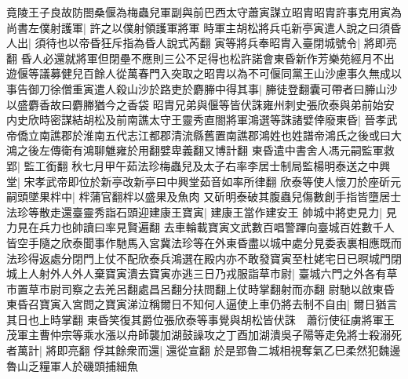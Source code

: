 竟陵王子良故防閤桑偃為梅蟲兒軍副與前巴西太守蕭寅謀立昭胄昭胄許事克用寅為尚書左僕射護軍|{
	許之以僕射領護軍將軍}
時軍主胡松將兵屯新亭寅遣人說之曰須昏人出|{
	須待也以帝昏狂斥指為昏人說式芮翻}
寅等將兵奉昭胄入臺閉城號令|{
	將即亮翻}
昏人必還就將軍但閉壘不應則三公不足得也松許諾會東昏新作芳樂苑經月不出遊偃等議募健兒百餘人從萬春門入突取之昭胄以為不可偃同黨王山沙慮事久無成以事告御刀徐僧重寅遣人殺山沙於路吏於麝幐中得其事|{
	幐徒登翻囊可帶者曰幐山沙以盛麝香故曰麝幐猶今之香袋}
昭胄兄弟與偃等皆伏誅雍州刺史張欣泰與弟前始安内史欣時密謀結胡松及前南譙太守王靈秀直閤將軍鴻選等誅諸嬖倖廢東昏|{
	晉孝武帝僑立南譙郡於淮南五代志江都郡清流縣舊置南譙郡鴻姓也姓譜帝鴻氏之後或曰大鴻之後左傳衛有鴻聊魋雍於用翻嬖卑義翻又博計翻}
東昏遣中書舍人馮元嗣監軍救郢|{
	監工銜翻}
秋七月甲午茹法珍梅蟲兒及太子右率李居士制局監楊明泰送之中興堂|{
	宋孝武帝即位於新亭改新亭曰中興堂茹音如率所律翻}
欣泰等使人懷刀於座斫元嗣頭墜果柈中|{
	柈蒲官翻柈以盛果及魚肉}
又斫明泰破其腹蟲兒傷數創手指皆墮居士法珍等散走還臺靈秀詣石頭迎建康王寶寅|{
	建康王當作建安王}
帥城中將吏見力|{
	見力見在兵力也帥讀曰率見賢遍翻}
去車輪載寶寅文武數百唱警蹕向臺城百姓數千人皆空手隨之欣泰聞事作馳馬入宮冀法珍等在外東昏盡以城中處分見委表裏相應既而法珍得返處分閉門上仗不配欣泰兵鴻選在殿内亦不敢發寶寅至杜姥宅日已暝城門閉城上人射外人外人棄寶寅潰去寶寅亦逃三日乃戎服詣草市尉|{
	臺城六門之外各有草市置草市尉司察之去羌呂翻處昌呂翻分扶問翻上仗時掌翻射而亦翻}
尉馳以啟東昏東昏召寶寅入宮問之寶寅涕泣稱爾日不知何人逼使上車仍將去制不自由|{
	爾日猶言其日也上時掌翻}
東昏笑復其爵位張欣泰等事覺與胡松皆伏誅　蕭衍使征虜將軍王茂軍主曹仲宗等乘水漲以舟師襲加湖鼓譟攻之丁酉加湖潰吳子陽等走免將士殺溺死者萬計|{
	將即亮翻}
俘其餘衆而還|{
	還從宣翻}
於是郢魯二城相視奪氣乙巳柔然犯魏邊　魯山乏糧軍人於磯頭捕細魚

